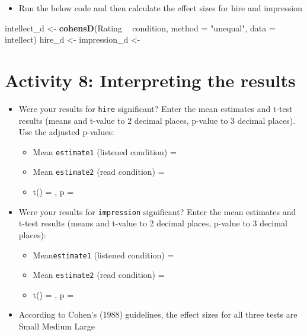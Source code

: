 \documentclass[]{book}
\newenvironment{Shaded}{\begin{snugshade}}{\end{snugshade}}
\newcommand{\DataTypeTok}[1]{\textcolor[rgb]{0.13,0.29,0.53}{#1}}
\newcommand{\KeywordTok}[1]{\textcolor[rgb]{0.13,0.29,0.53}{\textbf{#1}}}
\newcommand{\NormalTok}[1]{#1}
\newcommand{\OperatorTok}[1]{\textcolor[rgb]{0.81,0.36,0.00}{\textbf{#1}}}
\newcommand{\StringTok}[1]{\textcolor[rgb]{0.31,0.60,0.02}{#1}}
\providecommand{\tightlist}{%
  \setlength{\itemsep}{0pt}\setlength{\parskip}{0pt}}
\begin{document}
\begin{itemize}
\tightlist
\item
  Run the below code and then calculate the effect sizes for hire and impression
\end{itemize}

\begin{Shaded}
\begin{Highlighting}[]
\NormalTok{intellect_d <-}\StringTok{ }\KeywordTok{cohensD}\NormalTok{(Rating }\OperatorTok{~}\StringTok{ }\NormalTok{condition, }\DataTypeTok{method =} \StringTok{"unequal"}\NormalTok{, }\DataTypeTok{data =}\NormalTok{ intellect)}
\NormalTok{hire_d <-}\StringTok{ }
\NormalTok{impression_d <-}\StringTok{ }
\end{Highlighting}
\end{Shaded}

\hypertarget{activity-8-interpreting-the-results}{%
\section{Activity 8: Interpreting the results}\label{activity-8-interpreting-the-results}}

\begin{itemize}
\item
  Were your results for \texttt{hire} significant? Enter the mean estimates and t-test results (means and t-value to 2 decimal places, p-value to 3 decimal places). Use the adjusted p-values:

  \begin{itemize}
  \item
    Mean \texttt{estimate1} (listened condition) = 
  \item
    Mean \texttt{estimate2} (read condition) = 
  \item
    t() = , p = 
  \end{itemize}
\item
  Were your results for \texttt{impression} significant? Enter the mean estimates and t-test results (means and t-value to 2 decimal places, p-value to 3 decimal places):

  \begin{itemize}
  \item
    Mean\texttt{estimate1} (listened condition) = 
  \item
    Mean \texttt{estimate2} (read condition) = 
  \item
    t() = , p = 
  \end{itemize}
\item
  According to Cohen's (1988) guidelines, the effect sizes for all three tests are Small Medium Large
\end{itemize}
\end{document}

